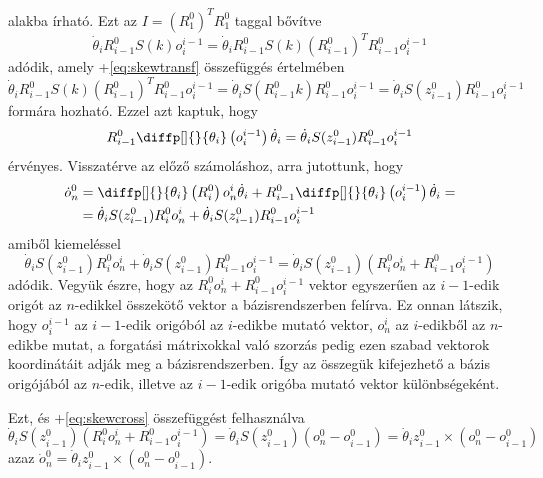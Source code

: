 \documentclass[12pt,a4paper]{report}
\theoremstyle{remark}
\theoremstyle{definition}
\begin{document}
alakba írható. Ezt az $I = (R^{0}_{1})^T R^{0}_{1}$ taggal bővítve
\begin{equation}
\dot{\theta}_i R^{0}_{i-1} S(k) o^{i-1}_{i} =
    \dot{\theta}_i R^{0}_{i-1} S(k) (R^{0}_{i-1})^T R^{0}_{i-1} o^{i-1}_{i}
\end{equation}
adódik, amely \az+\eqref{eq:skewtransf} összefüggés értelmében
\begin{equation}
\dot{\theta}_i R^{0}_{i-1} S(k) (R^{0}_{i-1})^T R^{0}_{i-1} o^{i-1}_{i} 
    = \dot{\theta}_i S(R^{0}_{i-1} k) R^{0}_{i-1} o^{i-1}_{i}
    = \dot{\theta}_i S(z^{0}_{i-1}) R^{0}_{i-1} o^{i-1}_{i}
\end{equation}
formára hozható. Ezzel azt kaptuk, hogy
\begin{equation}
R^{0}_{i-1} \diffp[]{}{\theta_i} \left( o^{i-1}_{i} \right) \dot{\theta}_i = 
    \dot{\theta}_i S(z^{0}_{i-1}) R^{0}_{i-1} o^{i-1}_{i}
\end{equation}
érvényes. Visszatérve az előző számoláshoz, arra jutottunk, hogy 
\begin{equation}
\begin{aligned}
\dot{o}^{0}_{n} &= \diffp[]{}{\theta_i} \left( R^{0}_{i} \right) o^{i}_{n} \dot{\theta}_i + 
    R^{0}_{i-1} \diffp[]{}{\theta_i} \left( o^{i-1}_{i} \right) \dot{\theta}_i = \\
&= \dot{\theta}_i S(z^{0}_{i-1}) R^{0}_{i}o^{i}_{n} + 
    \dot{\theta}_i S(z^{0}_{i-1}) R^{0}_{i-1}o^{i-1}_{i}
\end{aligned}
\end{equation}
amiből kiemeléssel
\begin{equation}
\dot{\theta}_i S(z^{0}_{i-1}) R^{0}_{i}o^{i}_{n} + \dot{\theta}_i S(z^{0}_{i-1}) R^{0}_{i-1}o^{i-1}_{i} =
    \dot{\theta}_i S(z^{0}_{i-1}) \left( R^{0}_{i}o^{i}_{n} + R^{0}_{i-1}o^{i-1}_{i} \right)
\end{equation}
adódik. Vegyük észre, hogy az $ R^{0}_{i}o^{i}_{n} + R^{0}_{i-1}o^{i-1}_{i}$ vektor egyszerűen az $i-1$-edik origót 
az $n$-edikkel összekötő vektor a bázisrendszerben felírva. Ez onnan látszik, hogy $o^{i-1}_{i}$ az $i-1$-edik 
origóból az $i$-edikbe mutató vektor, $o^{i}_{n}$ az $i$-edikből az $n$-edikbe mutat, a forgatási mátrixokkal való 
szorzás pedig ezen szabad vektorok koordinátáit adják meg a bázisrendszerben. Így az összegük kifejezhető a bázis 
origójából az $n$-edik, illetve az $i-1$-edik origóba mutató vektor különbségeként.

Ezt, és \az+\eqref{eq:skewcross} összefüggést felhasználva
\begin{equation}
\dot{\theta}_i S(z^{0}_{i-1}) \left( R^{0}_{i}o^{i}_{n} + R^{0}_{i-1}o^{i-1}_{i} \right)
    = \dot{\theta}_i S(z^{0}_{i-1}) \left( o^{0}_{n} - o^{0}_{i-1} \right)
    = \dot{\theta}_i z^{0}_{i-1} \times \left( o^{0}_{n} - o^{0}_{i-1} \right)
\end{equation}
azaz $\dot{o}^{0}_{n} = \dot{\theta}_i z^{0}_{i-1} \times \left( o^{0}_{n} - o^{0}_{i-1} \right)$.
\end{document}
